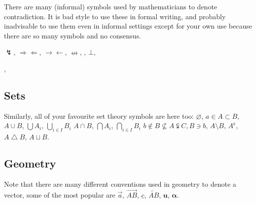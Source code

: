 \documentclass[a4paper,11pt]{article}
\begin{document}
There are many (informal) symbols used by mathematicians to denote contradiction. It is bad style to use these in formal writing, and probably inadvisable to use them even in informal settings except for your own use because there are so many symbols and no consensus. 

$ \lightning $,	%
$ \Rightarrow\!\Leftarrow $, 	%
$ \rightarrow\!\leftarrow $, 	%
$ \nleftrightarrow $,  			%
\textreferencemark,  			%
$\bot$, 						%
,  			%

\subsection{Sets}

Similarly, all of your favourite set theory symbols  are here too:
$ \varnothing $, 			%
$ a \in A \subset B $, 		%
$ A \cup B $, 				%
$ \bigcup A_i $, $ \bigcup_{i \in I} B_i $ %
$ A \cap B $, 				%
$ \bigcap A_i$, $ \bigcap_{i \in I} B_i$ %
$ b \notin B \nsubseteq A \subsetneqq C, B \ni b $, 
$ A \setminus B $, 			%
$ A^\mathsf{c} $, 			%
$ A \bigtriangleup B $, 	%
$ A \sqcup B $.				%

\subsection{Geometry}

Note that there are many different conventions used in geometry to denote a vector, some of the most popular are
$ \vec{a} $,					%
$ \overrightarrow{AB} $,		%
$ \underline{c} $,				%
$ \underleftarrow{AB} $,		%
$ \mathbf{u} $, 				%
$ \bm{\alpha} $. 				%
\end{document}
